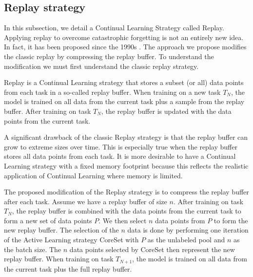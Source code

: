 \subsection{Replay strategy}
\label{sec:Methodology:ReplayStrategy}
In this subsection, we detail a Continual Learning Strategy called Replay. Applying replay to overcome catastrophic forgetting is not an entirely new idea. In fact, it
has been proposed since the 1990s \cite{robins1995catastrophic}. The approach we propose modifies the classic replay by compressing the replay buffer. To understand the modification
we must first understand the classic replay strategy. \par
Replay is a Continual Learning strategy that stores a subset (or all) data points from each task in a so-called replay buffer. When training on a new task $T_N$, the model is trained 
on all data from the current task plus a sample from the replay buffer. After training on task $T_N$, the replay buffer is updated with the data points from the current task. \par
A significant drawback of the classic Replay strategy is that the replay buffer can grow to extreme sizes over time. This is especially true when the replay buffer stores all data points from
each task. It is more desirable to have a Continual Learning strategy with a fixed memory footprint because this reflects the realistic application of Continual Learning where memory 
is limited. \par
The proposed modification of the Replay strategy is to compress the replay buffer after each task. Assume we have a replay buffer of size $n$. After training on task $T_N$, the replay buffer
is combined with the data points from the current task to form a new set of data points $P$. We then select $n$ data points from $P$ to form the new replay buffer. The selection of the $n$ data
is done by performing one iteration of the Active Learning strategy CoreSet \cite{sener2017active} with $P$ as the unlabeled pool and $n$ as the batch size. The $n$ data points selected by CoreSet then represent the new replay buffer. When training on task $T_{N+1}$, the model is trained on all data from the current task plus the full replay buffer.

